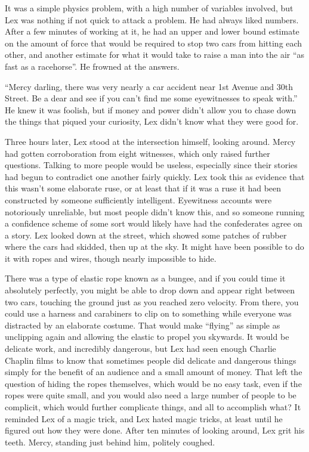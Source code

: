 \documentclass[ebook,12pt]{memoir}
\begin{document}
It was a simple physics problem, with a high number of variables
involved, but Lex was nothing if not quick to attack a problem. He had
always liked numbers. After a few minutes of working at it, he had an
upper and lower bound estimate on the amount of force that would be
required to stop two cars from hitting each other, and another estimate
for what it would take to raise a man into the air ``as fast as a
racehorse''. He frowned at the answers.

``Mercy darling, there was very nearly a car accident near 1st Avenue
and 30th Street. Be a dear and see if you can't find me some
eyewitnesses to speak with.'' He knew it was foolish, but if money and
power didn't allow you to chase down the things that piqued your
curiosity, Lex didn't know what they were good for.

Three hours later, Lex stood at the intersection himself, looking
around. Mercy had gotten corroboration from eight witnesses, which only
raised further questions. Talking to more people would be useless,
especially since their stories had begun to contradict one another
fairly quickly. Lex took this as evidence that this wasn't some
elaborate ruse, or at least that if it was a ruse it had been
constructed by someone sufficiently intelligent. Eyewitness accounts
were notoriously unreliable, but most people didn't know this, and so
someone running a confidence scheme of some sort would likely have had
the confederates agree on a story. Lex looked down at the street, which
showed some patches of rubber where the cars had skidded, then up at the
sky. It might have been possible to do it with ropes and wires, though
nearly impossible to hide.

There was a type of elastic rope known as a bungee, and if you could
time it absolutely perfectly, you might be able to drop down and appear
right between two cars, touching the ground just as you reached zero
velocity. From there, you could use a harness and carabiners to clip on
to something while everyone was distracted by an elaborate costume. That
would make ``flying'' as simple as unclipping again and allowing the
elastic to propel you skywards. It would be delicate work, and
incredibly dangerous, but Lex had seen enough Charlie Chaplin films to
know that sometimes people did delicate and dangerous things simply for
the benefit of an audience and a small amount of money. That left the
question of hiding the ropes themselves, which would be no easy task,
even if the ropes were quite small, and you would also need a large
number of people to be complicit, which would further complicate things,
and all to accomplish what? It reminded Lex of a magic trick, and Lex
hated magic tricks, at least until he figured out how they were done.
After ten minutes of looking around, Lex grit his teeth. Mercy, standing
just behind him, politely coughed.
\end{document}
